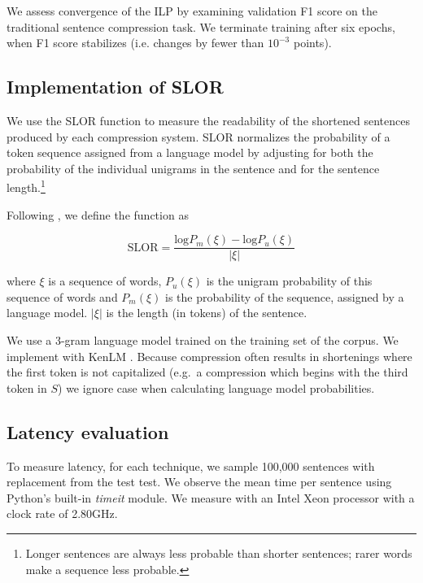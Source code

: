 We assess convergence of the ILP by examining validation F1 score on the traditional sentence compression task. We terminate training after six epochs, when F1 score stabilizes (i.e. changes by fewer than $10^{-3}$ points).

\subsection{Implementation of SLOR}

We use the SLOR function to measure the readability of the shortened sentences produced by each compression system. SLOR normalizes the probability of a token sequence assigned from a language model by adjusting for both the probability of the individual unigrams in the sentence and for the sentence length.\footnote{Longer sentences are always less probable than shorter sentences; rarer words make a sequence less probable.} 

Following \cite{lau2015unsupervised}, we define the function as 

\begin{equation}
\text{SLOR}=\frac{\text{log}P_m(\xi) - \text{log}P_u(\xi)}{|\xi|}
\end{equation}

where $\xi$ is a sequence of words, $P_u(\xi)$ is the unigram probability of this sequence of words and $P_m(\xi)$ is the probability of the sequence, assigned by a language model.  $|\xi|$ is the length (in tokens) of the sentence.

We use a 3-gram language model trained on the training set of the \citet{filippova2013overcoming} corpus. We implement with KenLM \cite{Heafield-kenlm}. Because compression often results in shortenings where the first token is not capitalized (e.g.\ a compression which begins with the third token in $S$) we ignore case when calculating language model probabilities.

\subsection{Latency evaluation}
To measure latency, for each technique, we sample 100,000 sentences with replacement from the test test. We observe the mean time per sentence using Python's built-in \textit{timeit} module. We measure with an Intel Xeon processor with a clock rate of 2.80GHz. 

